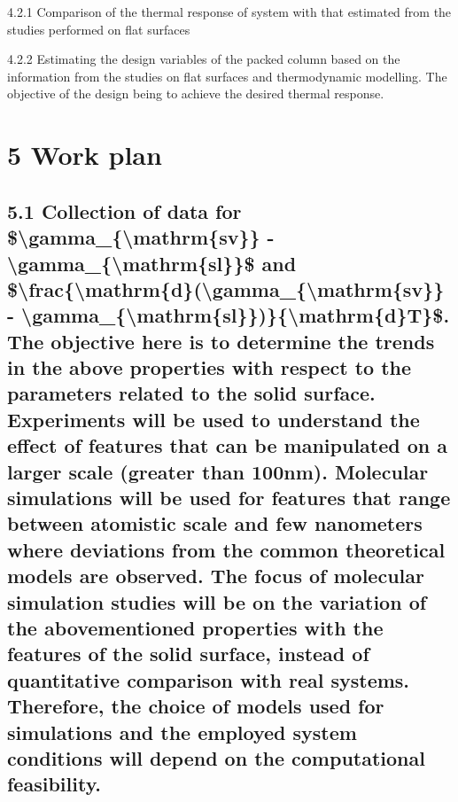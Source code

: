 \par 4.2.1 Comparison of the thermal response of system with that estimated from the studies performed on flat surfaces
\par 4.2.2 Estimating the design variables of the packed column based on the information from the studies on flat surfaces and thermodynamic modelling. The objective of the design being to achieve the desired thermal response.\section{5 Work plan}
\subsection{5.1 Collection of data for \$\textbackslash gamma\_\{\textbackslash mathrm\{sv\}\} - \textbackslash gamma\_\{\textbackslash mathrm\{sl\}\}\$ and \$\textbackslash frac\{\textbackslash mathrm\{d\}(\textbackslash gamma\_\{\textbackslash mathrm\{sv\}\} - \textbackslash gamma\_\{\textbackslash mathrm\{sl\}\})\}\{\textbackslash mathrm\{d\}T\}\$. The objective here is to determine the trends in the above properties with respect to the parameters related to the solid surface. Experiments will be used to understand the effect of features that can be manipulated on a larger scale (greater than 100nm). Molecular simulations will be used for features that range between atomistic scale and few nanometers where deviations from the common theoretical models are observed. The focus of molecular simulation studies will be on the variation of the abovementioned properties with the features of the solid surface, instead of quantitative comparison with real systems. Therefore, the choice of models used for simulations and the employed system conditions will depend on the computational feasibility.}

